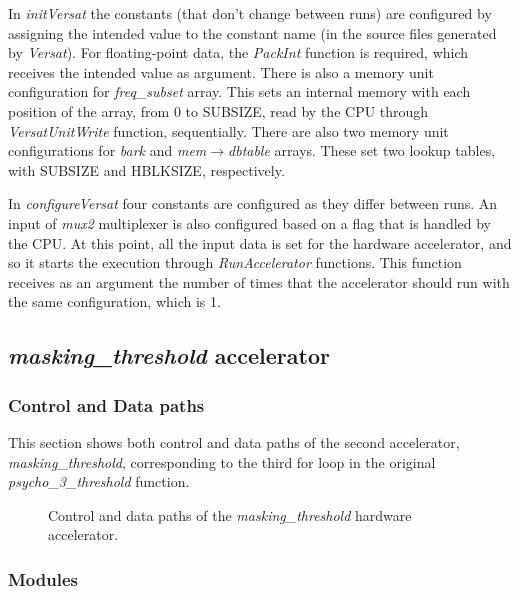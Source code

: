In \textit{initVersat} the constants (that don't change between runs) are configured by assigning the intended value to the constant name (in the source files generated by \textit{Versat}). For floating-point data, the \textit{PackInt} function is required, which receives the intended value as argument.
There is also a memory unit configuration for \textit{freq\_subset} array. This sets an internal memory with each position of the array, from 0 to SUBSIZE, read by the CPU through \textit{VersatUnitWrite} function, sequentially.
There are also two memory unit configurations for \textit{bark} and \textit{mem}$\rightarrow$\textit{dbtable} arrays. These set two lookup tables, with SUBSIZE and HBLKSIZE, respectively.

In \textit{configureVersat} four constants are configured as they differ between runs. An input of \textit{mux2} multiplexer is also configured based on a flag that is handled by the CPU.
At this point, all the input data is set for the hardware accelerator, and so it starts the execution through \textit{RunAccelerator} functions. This function receives as an argument the number of times that the accelerator should run with the same configuration, which is 1.


\subsection{\textit{masking\_threshold} accelerator}

\subsubsection{Control and Data paths}
This section shows both control and data paths of the second accelerator, \textit{masking\_threshold}, corresponding to the third for loop in the original \textit{psycho\_3\_threshold} function.

\begin{figure}[H]
\centerline{}
\caption{Control and data paths of the \textit{masking\_threshold} hardware accelerator.}
\label{data2}
\end{figure}

\subsubsection{Modules}

\vspace{0.5cm}

